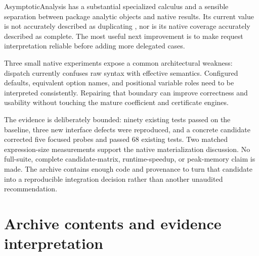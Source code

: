 \documentclass[11pt,a4paper]{article}
\newcommand{\code}[1]{\texttt{\detokenize{#1}}}
\begin{document}
AsymptoticAnalysis has a substantial specialized calculus and a sensible separation between package analytic objects and native results. Its current value is not accurately described as duplicating \code{Series}, nor is its native coverage accurately described as complete. The most useful next improvement is to make request interpretation reliable before adding more delegated cases.

Three small native experiments expose a common architectural weakness: dispatch currently confuses raw syntax with effective semantics. Configured defaults, equivalent option names, and positional variable roles need to be interpreted consistently. Repairing that boundary can improve correctness and usability without touching the mature coefficient and certificate engines.

The evidence is deliberately bounded: ninety existing tests passed on the baseline, three new interface defects were reproduced, and a concrete candidate corrected five focused probes and passed 68 existing tests. Two matched expression-size measurements support the native materialization discussion. No full-suite, complete candidate-matrix, runtime-speedup, or peak-memory claim is made. The archive contains enough code and provenance to turn that candidate into a reproducible integration decision rather than another unaudited recommendation.

\appendix
\section{Archive contents and evidence interpretation}
\end{document}
